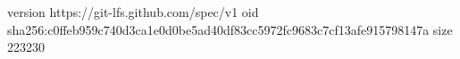 version https://git-lfs.github.com/spec/v1
oid sha256:c0ffeb959c740d3ca1e0d0be5ad40df83cc5972fc9683c7cf13afe915798147a
size 223230

